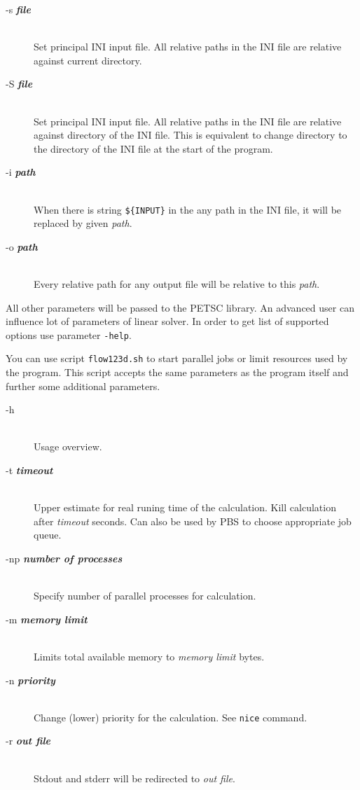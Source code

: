 \documentclass[12pt,a4paper]{report}
\begin{document}
\begin{description}
 \item[-s {\bf\it file}] \hfill\\
 	 Set principal INI input file. All relative paths in the INI file are relative against current directory.
 \item[-S {\bf\it file}] \hfill\\
 	Set principal INI input file. All relative paths in the INI file are relative against directory of the INI file. This is equivalent
to change directory to the directory of the INI file at the start of the program.
 \item[-i {\bf\it path}] \hfill\\
 	When there is string \verb"${INPUT}" %
  	in the any path in the INI file, it will be replaced by given {\it path}.
 \item[-o {\bf\it path}] \hfill\\
 	Every relative path for any output file will be relative to this {\it path}. 
\end{description}

All other parameters will be passed to the PETSC library. An advanced user can influence lot of parameters of linear solver. In order to get list of supported options 
use parameter \verb'-help'.


You can use script \verb'flow123d.sh' to start parallel jobs or limit resources used by the program. This script accepts the same parameters as the program itself
and further some additional parameters.

\begin{description}
  \item[-h] \hfill\\
  	Usage overview.
  \item[-t {\bf\it timeout}] \hfill\\
  	Upper estimate for real runing time of the calculation. Kill calculation after {\it timeout} seconds. 
  	Can also be used by PBS to choose appropriate job queue. 
  \item[-np {\bf\it number of processes}] \hfill\\
  	Specify number of parallel processes for calculation.
  \item[-m {\bf\it memory limit}] \hfill\\
  	Limits total available memory to {\it memory limit} bytes.
  \item[-n {\bf\it priority}] \hfill\\
  	Change (lower) priority for the calculation. See {\tt nice} command.
  \item[-r {\bf\it out file}] \hfill\\
  	Stdout and stderr will be redirected to {\it out file}.
\end{description}
\end{document}
